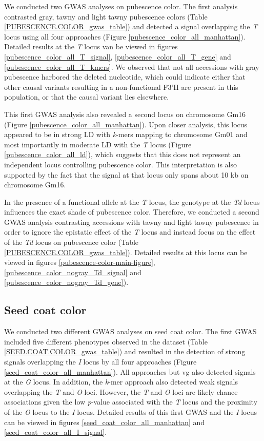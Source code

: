 We conducted two GWAS analyses on pubescence color. The first analysis
contrasted gray, tawny and light tawny pubescence colors (Table
\ref{PUBESCENCE.COLOR_gwas_table}) and detected a signal overlapping the
\emph{T} locus using all four approaches (Figure
\ref{pubescence_color_all_manhattan}). Detailed results at the \textit{T} locus
van be viewed in figures \ref{pubescence_color_all_T_signal},
\ref{pubescence_color_all_T_gene} and \ref{pubescence_color_all_T_kmers}. We
observed that not all accessions with gray pubescence harbored the deleted
nucleotide, which could indicate either that other causal variants resulting in
a non-functional F3’H are present in this population, or that the causal
variant lies elsewhere.

This first GWAS analysis also revealed a second locus on chromosome Gm16
(Figure \ref{pubescence_color_all_manhattan}). Upon closer analysis, this locus
appeared to be in strong LD with \emph{k}-mers mapping to chromosome Gm01 and
most importantly in moderate LD with the \emph{T} locus (Figure
\ref{pubescence_color_all_ld}), which suggests that this does not represent an
independent locus controlling pubescence color. This interpretation is also
supported by the fact that the signal at that locus only spans about 10 kb on
chromosome Gm16.

In the presence of a functional allele at the \emph{T} locus, the genotype at
the \emph{Td} locus influences the exact shade of pubescence color.  Therefore,
we conducted a second GWAS analysis contrasting accessions with tawny and light
tawny pubescence in order to ignore the epistatic effect of the \emph{T} locus
and instead focus on the effect of the \emph{Td} locus on pubescence color
(Table \ref{PUBESCENCE.COLOR_gwas_table}). Detailed results at this locus
can be viewed in figures \ref{pubescence-color-main-figure}, \ref{pubescence_color_nogray_Td_signal} and
\ref{pubescence_color_nogray_Td_gene}). 

\subsection*{Seed coat color}
\label{sv-gwas-seed-coat-color}

We conducted two different GWAS analyses on seed coat color. The first GWAS
included five different phenotypes observed in the dataset (Table
\ref{SEED.COAT.COLOR_gwas_table}) and resulted in the detection of strong
signals overlapping the \emph{I} locus by all four approaches (Figure
\ref{seed_coat_color_all_manhattan}). All approaches but vg also detected
signals at the \emph{G} locus. In addition, the \emph{k}-mer approach also
detected weak signals overlapping the \emph{T} and \emph{O} loci. However, the
\emph{T} and \emph{O} loci are likely chance associations given the low \textit{p}-value
associated with the \emph{T} locus and the proximity of the \emph{O} locus to
the \emph{I} locus. Detailed results of this first GWAS and the \textit{I}
locus can be viewed in figures \ref{seed_coat_color_all_manhattan} and
\ref{seed_coat_color_all_I_signal}.

